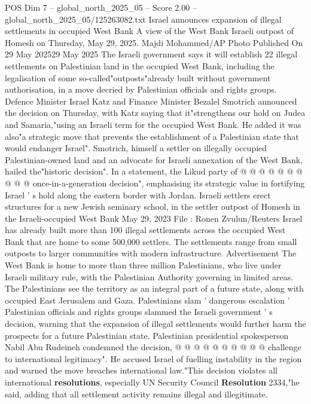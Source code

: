 \begin{textsample}{POS Dim 7 – global\_north\_2025\_05 – Score 2.00 – global\_north\_2025\_05/125263082.txt}  \label{ex:f7_pos_348}
Israel announces expansion of illegal settlements in occupied West Bank A view of the West Bank Israeli outpost of Homesh on Thursday, May 29, 2025.
Majdi Mohammed/AP Photo Published On 29 May 202529 May 2025 The Israeli government says it will establish 22 illegal settlements on Palestinian land in the occupied West Bank, including the legalisation of some so-called"outposts"already built without government authorisation, in a move decried by Palestinian officials and rights groups.
Defence Minister Israel Katz and Finance Minister Bezalel Smotrich announced the decision on Thursday, with Katz saying that it"strengthens our hold on Judea and Samaria,"using an Israeli term for the occupied West Bank.
He added it was also"a strategic move that prevents the establishment of a Palestinian state that would endanger Israel".
Smotrich, himself a settler on illegally occupied Palestinian-owned land and an advocate for Israeli annexation of the West Bank, hailed the"historic decision".
In a statement, the Likud party of @ @ @ @ @ @ @ @ @ @ once-in-a-generation decision", emphasising its strategic value in fortifying Israel ' s hold along the eastern border with Jordan.
Israeli settlers erect structures for a new Jewish seminary school, in the settler outpost of Homesh in the Israeli-occupied West Bank May 29, 2023 File : Ronen Zvulun/Reuters Israel has already built more than 100 illegal settlements across the occupied West Bank that are home to some 500,000 settlers.
The settlements range from small outposts to larger communities with modern infrastructure.
Advertisement The West Bank is home to more than three million Palestinians, who live under Israeli military rule, with the Palestinian Authority governing in limited areas.
The Palestinians see the territory as an integral part of a future state, along with occupied East Jerusalem and Gaza.
Palestinians slam ' dangerous escalation ' Palestinian officials and rights groups slammed the Israeli government ' s decision, warning that the expansion of illegal settlements would further harm the prospects for a future Palestinian state.
Palestinian presidential spokesperson Nabil Abu Rudeineh condemned the decision, @ @ @ @ @ @ @ @ @ @ challenge to international legitimacy".
He accused Israel of fuelling instability in the region and warned the move breaches international law."This decision violates all international \textbf{resolutions}, especially UN Security Council \textbf{Resolution} 2334,"he said, adding that all settlement activity remains illegal and illegitimate.

\end{textsample}

